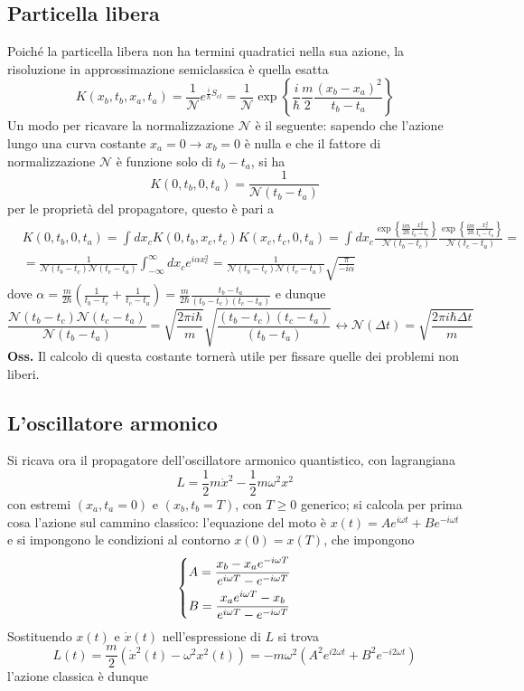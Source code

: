 \subsection{Particella libera}
Poiché la particella libera non ha termini quadratici nella sua azione, la risoluzione in
approssimazione semiclassica è quella esatta 
$$K(x_b,t_b,x_a,t_a) = \frac{1}{\mathcal{N}}e^{\frac{i}{\hbar}S_{cl}}=
\frac{1}{\mathcal{N}}\exp\left\{\frac{i}{\hbar}\frac{m}{2}\frac{(x_b-x_a)^2}
{t_b-t_a}\right\}$$
Un modo per ricavare la normalizzazione $\mathcal{N}$ è il seguente: sapendo che l'azione lungo una
curva costante $x_a=0\to x_b=0$ è nulla e che il fattore di normalizzazione $\mathcal{N}$ è funzione
solo di $t_b-t_a$, si ha
$$K(0,t_b,0,t_a) = \frac{1}{\mathcal{N}(t_b-t_a)}$$
per le proprietà del propagatore, questo è pari a
\begin{align*}
    &K(0,t_b,0,t_a) =\int_{}^{}dx_cK(0,t_b,x_c,t_c)K(x_c,t_c,0,t_a) 
    =\int_{}^{}dx_c\frac{\exp\left\{\frac{im}{2\hbar}\frac{x_c^2}{t_b-t_c}\right\}}
    {\mathcal{N}(t_b-t_c)} \frac{\exp\left\{\frac{im}{2\hbar}\frac{x_c^2}{t_c-t_a}\right\}}
    {\mathcal{N}(t_c-t_a)}=\\
    &=\frac{1}{\mathcal{N}(t_b-t_c)\mathcal{N}(t_c-t_a)}\int_{-\infty}^{\infty}dx_ce^{i\alpha x_c^2}=
    \frac{1}{\mathcal{N}(t_b-t_c)\mathcal{N}(t_c-t_a)}\sqrt{\frac{\pi}{-i\alpha}}
\end{align*}
dove $\alpha = \frac{m}{2\hbar}\left(\frac{1}{t_b-t_c}+\frac{1}{t_c-t_a}\right)= 
\frac{m}{2\hbar}\frac{t_b-t_a}{(t_b-t_c)(t_c-t_a)}$
e dunque
$$\frac{\mathcal{N}(t_b-t_c)\mathcal{N}(t_c-t_a)}{\mathcal{N}(t_b-t_a)} = \sqrt{\frac{2\pi i\hbar}{m}}
\sqrt{\frac{(t_b-t_c)(t_c-t_a)}{(t_b-t_a)}} \leftrightarrow \mathcal{N}(\Delta t) =
\sqrt{\frac{2\pi i\hbar\Delta t}{m}}$$
\textbf{Oss.} Il calcolo di questa costante tornerà utile per fissare quelle dei problemi non liberi.
\subsection{L'oscillatore armonico}
Si ricava ora il propagatore dell'oscillatore armonico quantistico, con lagrangiana
$$L = \frac{1}{2}m\dot x^2 - \frac{1}{2}m\omega^2x^2$$
con estremi $(x_a,t_a=0)$ e $(x_b,t_b=T)$, con $T\geq0$ generico; si calcola per
prima cosa l'azione sul cammino classico:
l'equazione del moto è $x(t) = Ae^{i\omega t}+Be^{-i\omega t}$ e si impongono le condizioni al contorno
$x(0) = x(T)$, che impongono
$$
\begin{dcases}
    A= \frac{x_b-x_ae^{-i\omega T}}{e^{i\omega T} - e^{-i\omega T}}\\
    B=\frac{x_ae^{i\omega T}-x_b}{e^{i\omega T} - e^{-i\omega T}}
\end{dcases}
$$
Sostituendo $x(t)$ e $\dot x(t)$ nell'espressione di $L$ si trova
$$L(t) = \frac{m}{2}\left(\dot x^2(t) - \omega^2x^2(t)\right) =
-m\omega^2\left(A^2e^{i2\omega t} + B^2e^{-i2\omega t}\right)$$
l'azione classica è dunque

